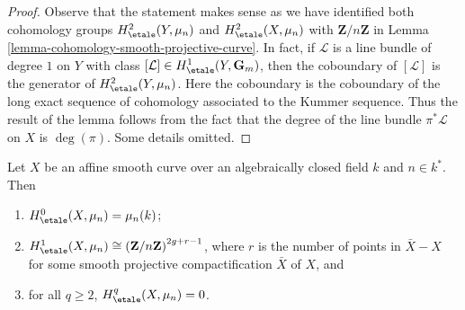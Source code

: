 \begin{proof}
Observe that the statement makes sense as we have identified both
cohomology groups $ H^2_\etale(Y, \mu_n)$ and $H^2_\etale(X, \mu_n)$
with $\mathbf{Z}/n\mathbf{Z}$ in
Lemma \ref{lemma-cohomology-smooth-projective-curve}.
In fact, if $\mathcal{L}$ is a line bundle of degree $1$
on $Y$ with class $[\mathcal{L}] \in H^1_\etale(Y, \mathbf{G}_m)$,
then the coboundary of $[\mathcal{L}]$ is the generator of
$H^2_\etale(Y, \mu_n)$. Here the coboundary is the coboundary
of the long exact sequence of cohomology associated to the Kummer
sequence. Thus the result of the lemma follows from the fact that
the degree of the line bundle $\pi^*\mathcal{L}$ on $X$ is $\deg(\pi)$.
Some details omitted.
\end{proof}

\begin{lemma}
\label{lemma-vanishing-cohomology-mu-smooth-curve}
Let $X$ be an affine smooth curve over an algebraically closed field $k$ and
$n\in k^*$. Then
\begin{enumerate}
\item
$H_\etale^0(X, \mu_n) = \mu_n(k)$;
\item
$H_\etale^1(X, \mu_n) \cong
\left(\mathbf{Z}/n\mathbf{Z}\right)^{2g+r-1}$, where
$r$ is the number of points in $\bar X - X$ for some smooth projective
compactification $\bar X$ of $X$, and
\item
for all $q\geq 2$, $H_\etale^q(X, \mu_n) = 0$.
\end{enumerate}
\end{lemma}

